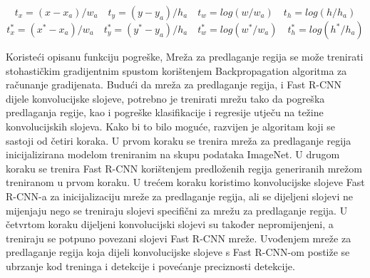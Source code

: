 \[
	t_x = (x - x_a) / w_a \quad t_y = (y - y_a) / h_a \quad
	t_w = log(w / w_a) \quad t_h = log(h / h_a)
\]
\[
	t_x^* = (x^* - x_a) / w_a \quad t_y^* = (y^* - y_a) / h_a \quad
	t_w^* = log(w^* / w_a) \quad t_h^* = log(h^* / h_a)
\]

Koristeći opisanu funkciju pogreške, Mreža za predlaganje regija se može trenirati stohastičkim gradijentnim spustom korištenjem Backpropagation algoritma za računanje gradijenata.
Budući da mreža za predlaganje regija, i Fast R-CNN dijele konvolucijske slojeve, potrebno je trenirati mrežu tako da pogreška predlaganja regije, kao i pogreške klasifikacije i regresije utječu na težine konvolucijskih slojeva. Kako bi to bilo moguće, razvijen je algoritam koji se sastoji od četiri koraka. U prvom koraku se trenira mreža za predlaganje regija inicijalizirana modelom treniranim na skupu podataka ImageNet. U drugom koraku se trenira Fast R-CNN korištenjem predloženih regija generiranih mrežom treniranom u prvom koraku. U trećem koraku koristimo konvolucijske slojeve Fast R-CNN-a za inicijalizaciju mreže za predlaganje regija, ali se dijeljeni slojevi ne mijenjaju nego se treniraju slojevi specifični za mrežu za predlaganje regija. U četvrtom koraku dijeljeni konvolucijski slojevi su također nepromijenjeni, a treniraju se potpuno povezani slojevi Fast R-CNN mreže.
Uvođenjem mreže za predlaganje regija koja dijeli konvolucijske slojeve s Fast R-CNN-om postiže se ubrzanje kod treninga i detekcije i povećanje preciznosti detekcije.
	